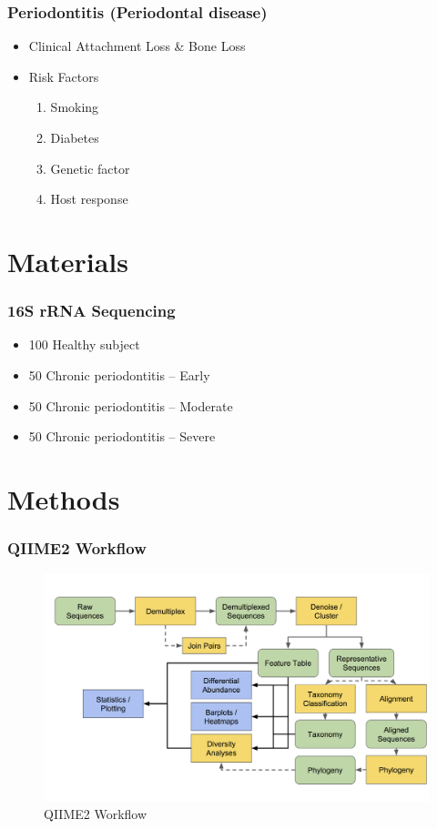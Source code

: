 \documentclass{beamer}
\begin{document}
    \begin{frame}
        \frametitle{Periodontitis (Periodontal disease)}

        \begin{itemize}
            \item Clinical Attachment Loss \& Bone Loss \cite{periodontitis1}
            \item Risk Factors \cite{periodontitis2}
            \begin{enumerate}
                \item Smoking
                \item Diabetes
                \item Genetic factor
                \item Host response
            \end{enumerate}
        \end{itemize}
    \end{frame}

    \section{Materials}
    \begin{frame}
        \frametitle{16S rRNA Sequencing}

        \begin{itemize}
            \item 100 Healthy subject
            \item 50 Chronic periodontitis -- Early
            \item 50 Chronic periodontitis -- Moderate
            \item 50 Chronic periodontitis -- Severe
        \end{itemize}
    \end{frame}

    \section{Methods}
    \begin{frame}
        \frametitle{QIIME2 Workflow}

        \begin{figure}
            \centering
            \includegraphics[width=0.7 \linewidth]{figures/qiime.png}
            \caption{QIIME2 Workflow \protect\cite{qiime1, qiime2}}
            \label{fig:qiime}
        \end{figure}
    \end{frame}
\end{document}
